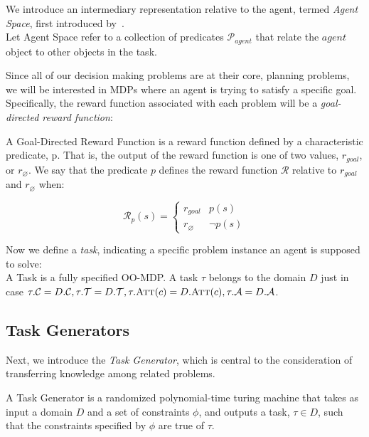 \documentclass[11pt]{article}
\begin{document}
We introduce an intermediary representation relative to the agent, termed {\it Agent Space}, first introduced by~\cite{konidaris2006framework}.\\

{ Let \textup{Agent Space} refer to a collection of predicates $\mathcal{P}_{agent}$ that relate the $agent$ object to other objects in the task}.

Since all of our decision making problems are at their core, planning problems, we will be interested in MDPs where an agent is trying to satisfy a specific goal. Specifically, the reward function associated with each problem will be a {\it goal-directed reward function}: \\

{ A \textup{Goal-Directed Reward Function} is a reward function defined by a characteristic predicate, p. That is, the output of the reward function is one of two values, $r_{goal}$, or $r_\varnothing$. We say that the predicate $p$ defines the reward function $\mathcal{R}$ relative to $r_{goal}$ and $r_\varnothing$ when:

\begin{equation}
\mathcal{R}_p(s) = \begin{cases}
r_{goal}& p(s) \\
r_\varnothing&\neg p(s)
\end{cases}
\end{equation}}

Now we define a {\it task}, indicating a specific problem instance an agent is supposed to solve: \\

{ A \textup{Task} is a fully specified OO-MDP. A task $\tau$ belongs to the domain $D$ just in case $\tau.\mathcal{C} = D.\mathcal{C}, \tau.\mathcal{T} = D.\mathcal{T}, \tau.\textsc{Att}(c) = D.\textsc{Att}(c), \tau.\mathcal{A} = D.\mathcal{A}$}.


\subsection{Task Generators}
Next, we introduce the {\it Task Generator}, which is central to the consideration of transferring knowledge among related problems.

{ A \textup{Task Generator} is a randomized polynomial-time turing machine that takes as input a domain $D$ and a set of constraints $\phi$, and outputs a task, $\tau \in D$, such that the constraints specified by $\phi$ are true of $\tau$.}
\end{document}
